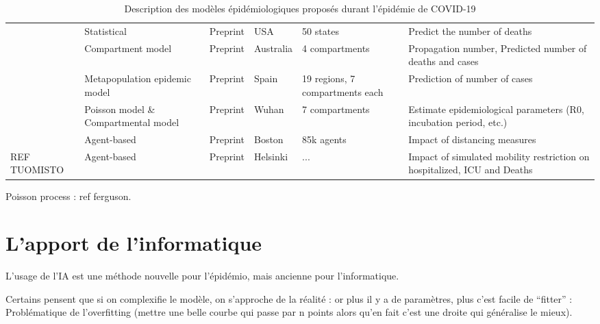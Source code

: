 \documentclass[review]{elsarticle}
\begin{document}
\begin{table}
\begin{adjustbox}{center}
{\begin{tabular}{p{4cm}|p{2cm}|p{2cm}|p{2cm}|p{2cm}|p{11cm}}
  \citet{woody_projections_2020} & Statistical & Preprint & USA & 50 states & Predict the number of deaths  \\
  \citet{platen_stochastic_2020} & Compartment model & Preprint & Australia & 4 compartments & Propagation number, Predicted number of deaths and cases  \\
  \citet{arenas_mathematical_2020} & Metapopulation epidemic model & Preprint & Spain & 19 regions, 7 compartments each & Prediction of number of cases  \\
  \citet{sanche_high_2020} & Poisson model \& Compartmental model & Preprint & Wuhan & 7 compartments & Estimate epidemiological parameters (R0, incubation period, etc.)  \\
  \citet{aleta_modeling_2020} & Agent-based & Preprint & Boston & 85k agents & Impact of distancing measures  \\
  REF TUOMISTO & Agent-based & Preprint & Helsinki & ... & Impact of simulated 	mobility restriction on hospitalized, ICU and Deaths \\

\end{tabular}}
\end{adjustbox}
\caption{Description des modèles épidémiologiques proposés durant l'épidémie de COVID-19}
\label{table:1}
\end{table}


Poisson process : ref ferguson.


\section{L'apport de l'informatique}

L'usage de l'IA est une méthode nouvelle pour l'épidémio, mais ancienne pour l'informatique.


Certains pensent que si on complexifie le modèle, on s'approche de la réalité : or plus il y a de paramètres, plus c'est facile de ``fitter'' : Problématique de l'overfitting (mettre une belle courbe qui passe par n points alors qu'en fait c'est une droite qui généralise le mieux).
\end{document}
